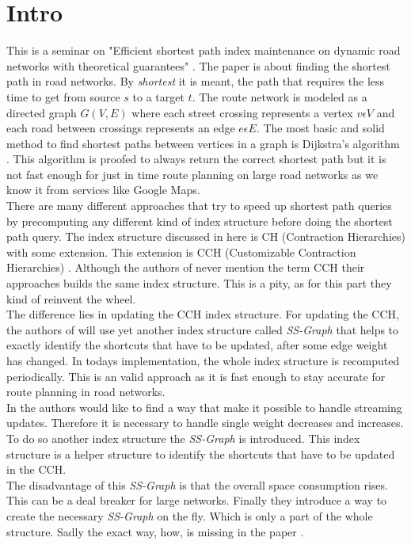 \documentclass[twocolumn]{article}
\begin{document}


\section{Intro}

This is a seminar on "Efficient shortest path index maintenance on dynamic
road networks with theoretical guarantees" \cite{Ouyang2020}. The paper is
about finding the shortest path in road networks. By \textit{shortest} it is meant,
the path that requires the less time to get from source $s$ to a target $t$. The route
network is modeled as a directed graph $G(V,E)$ where each street crossing represents a
vertex $v \epsilon V$ and each road between crossings represents an edge $e \epsilon E$.
The most basic and solid method to find shortest paths between vertices in a graph is
Dijkstra's algorithm \cite{Dijkstra1959}. This algorithm is proofed to always return the
correct shortest path but it is not fast enough for just in time route planning on large
road networks as we know it from services like Google Maps.
\\
There are many
different approaches that try to speed up shortest path queries by precomputing
any different kind of index structure before doing the shortest path query. The index
structure discussed in here \cite{Ouyang2020} is CH (Contraction Hierarchies)\cite{Geisberger2012}
with some extension. This extension is CCH (Customizable Contraction Hierarchies)
\cite{Dibbelt2014}. Although the authors of \cite{Ouyang2020} never mention the term
CCH their approaches builds the same index structure. This is a pity, as for this part
they kind of reinvent the wheel.
\\
The difference lies in updating
the CCH index structure. For updating the CCH, the authors of \cite{Ouyang2020} will use yet another
index structure called \textit{SS-Graph} that helps to exactly identify the shortcuts that
have to be updated, after some edge weight has changed. In todays implementation, the whole
index structure is recomputed periodically. This is an valid approach as it is fast enough
to stay accurate for route planning in road networks.
\\
In \cite{Ouyang2020} the authors would like to find a way that make it possible to handle streaming
updates. Therefore it is necessary to handle single weight decreases
and increases. To do so another index structure the \textit{SS-Graph} is introduced.
This index structure is a helper structure to identify the shortcuts
that have to be updated in the CCH.
\\
The disadvantage of this \textit{SS-Graph} is that the overall space consumption rises.
This can be a deal breaker for large networks.
Finally they introduce a way to create the necessary \textit{SS-Graph} on the fly. Which
is only a part of the whole structure.
Sadly the exact way, how, is missing in the paper \cite{Ouyang2020}.




 
\end{document}
